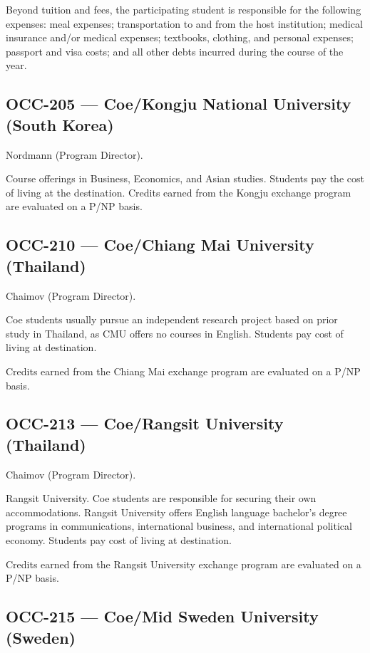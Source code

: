\documentclass[
  letterpaper,
]{scrbook}
\begin{document}
Beyond tuition and fees, the participating student is responsible for
the following expenses: meal expenses; transportation to and from the
host institution; medical insurance and/or medical expenses; textbooks,
clothing, and personal expenses; passport and visa costs; and all other
debts incurred during the course of the year.

\subsection{OCC-205 --- Coe/Kongju National University (South
Korea)}\label{occ-205-coekongju-national-university-south-korea}

Nordmann (Program Director).

Course offerings in Business, Economics, and Asian studies. Students pay
the cost of living at the destination. Credits earned from the Kongju
exchange program are evaluated on a P/NP basis.

\subsection{OCC-210 --- Coe/Chiang Mai University
(Thailand)}\label{occ-210-coechiang-mai-university-thailand}

Chaimov (Program Director).

Coe students usually pursue an independent research project based on
prior study in Thailand, as CMU offers no courses in English. Students
pay cost of living at destination.

Credits earned from the Chiang Mai exchange program are evaluated on a
P/NP basis.

\subsection{OCC-213 --- Coe/Rangsit University
(Thailand)}\label{occ-213-coerangsit-university-thailand}

Chaimov (Program Director).

Rangsit University. Coe students are responsible for securing their own
accommodations. Rangsit University offers English language bachelor's
degree programs in communications, international business, and
international political economy. Students pay cost of living at
destination.

Credits earned from the Rangsit University exchange program are
evaluated on a P/NP basis.

\subsection{OCC-215 --- Coe/Mid Sweden University
(Sweden)}\label{occ-215-coemid-sweden-university-sweden}
\end{document}
